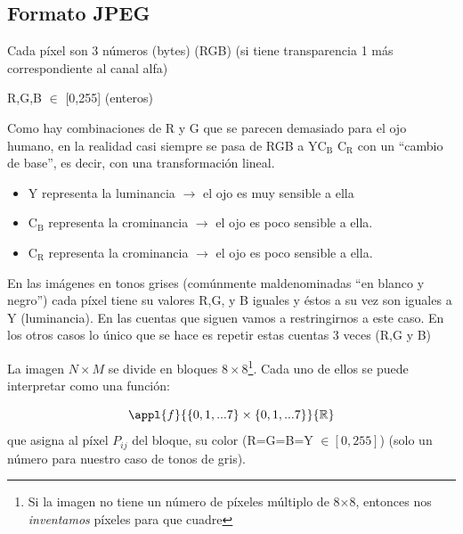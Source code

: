 	\subsection{Formato JPEG}

		\begin{center}
		\end{center}

		Cada píxel son 3 números (bytes) (RGB) (si tiene transparencia 1 más correspondiente al canal alfa)

		R,G,B $\in$ [0,255] (enteros)

		Como hay combinaciones de R y G que se parecen demasiado para el ojo humano, en la realidad casi siempre se pasa de RGB a Y$\text{C}_{\text{B}}$ $\text{C}_{\text{R}}$ con un ``cambio de base'', es decir, con una transformación lineal.

		\begin{itemize}
			\item Y representa la luminancia $\rightarrow$ el ojo es muy sensible a ella
			\item $\text{C}_{\text{B}}$ representa la crominancia $\rightarrow$ el ojo es poco sensible a ella.
			\item $\text{C}_{\text{R}}$ representa la crominancia $\rightarrow$ el ojo es poco sensible a ella.
		\end{itemize}



		En las imágenes en tonos grises (comúnmente maldenominadas ``en blanco y negro'') cada píxel tiene su valores R,G, y B iguales y éstos a su vez son iguales a Y (luminancia). En las cuentas que siguen vamos a restringirnos a este caso. En los otros casos lo único que se hace es repetir estas cuentas 3 veces (R,G y B)

		\begin{center}
		\end{center}

		La imagen $N \times M$ se divide en bloques $8 \times 8$\footnote{Si la imagen no tiene un número de píxeles múltiplo de 8×8, entonces nos \textit{inventamos} píxeles para que cuadre}. Cada uno de ellos se puede interpretar como una función:

		\[\appl{f}{\{0,1,...7\} \times \{0,1,...7\} }{\mathbb{R}}\]
		que asigna al píxel $P_{ij}$ del bloque, su color (R=G=B=Y $\in [0,255]$) (solo un número para nuestro caso de tonos de gris).



